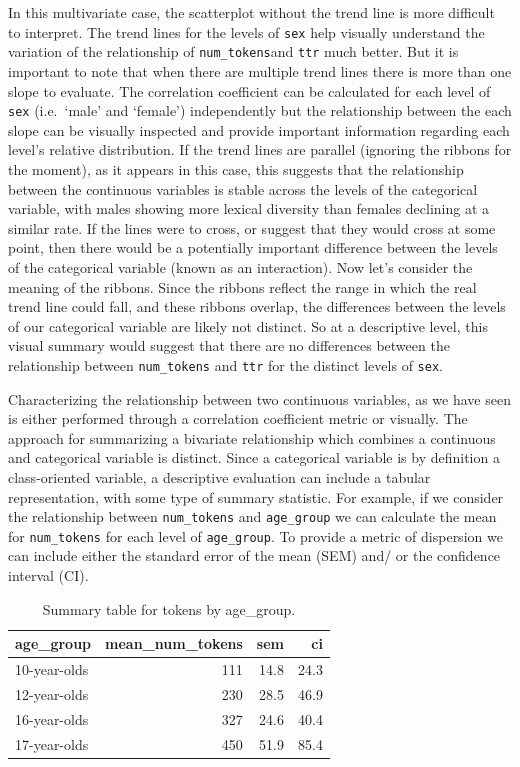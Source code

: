 \documentclass[
  letterpaper,
]{scrbook}
\begin{document}
In this multivariate case, the scatterplot without the trend line is
more difficult to interpret. The trend lines for the levels of
\texttt{sex} help visually understand the variation of the relationship
of \texttt{num\_tokens}and \texttt{ttr} much better. But it is important
to note that when there are multiple trend lines there is more than one
slope to evaluate. The correlation coefficient can be calculated for
each level of \texttt{sex} (i.e.~`male' and `female') independently but
the relationship between the each slope can be visually inspected and
provide important information regarding each level's relative
distribution. If the trend lines are parallel (ignoring the ribbons for
the moment), as it appears in this case, this suggests that the
relationship between the continuous variables is stable across the
levels of the categorical variable, with males showing more lexical
diversity than females declining at a similar rate. If the lines were to
cross, or suggest that they would cross at some point, then there would
be a potentially important difference between the levels of the
categorical variable (known as an interaction). Now let's consider the
meaning of the ribbons. Since the ribbons reflect the range in which the
real trend line could fall, and these ribbons overlap, the differences
between the levels of our categorical variable are likely not distinct.
So at a descriptive level, this visual summary would suggest that there
are no differences between the relationship between \texttt{num\_tokens}
and \texttt{ttr} for the distinct levels of \texttt{sex}.

Characterizing the relationship between two continuous variables, as we
have seen is either performed through a correlation coefficient metric
or visually. The approach for summarizing a bivariate relationship which
combines a continuous and categorical variable is distinct. Since a
categorical variable is by definition a class-oriented variable, a
descriptive evaluation can include a tabular representation, with some
type of summary statistic. For example, if we consider the relationship
between \texttt{num\_tokens} and \texttt{age\_group} we can calculate
the mean for \texttt{num\_tokens} for each level of \texttt{age\_group}.
To provide a metric of dispersion we can include either the standard
error of the mean (SEM) and/ or the confidence interval (CI).

\hypertarget{tbl-summarize-bivariate-cont-cat-belc}{}
\begin{table}
\caption{\label{tbl-summarize-bivariate-cont-cat-belc}Summary table for tokens by age\_group. }\tabularnewline

\centering
\begin{tabular}{lrrr}
\toprule
age\_group & mean\_num\_tokens & sem & ci\\
\midrule
10-year-olds & 111 & 14.8 & 24.3\\
12-year-olds & 230 & 28.5 & 46.9\\
16-year-olds & 327 & 24.6 & 40.4\\
17-year-olds & 450 & 51.9 & 85.4\\
\bottomrule
\end{tabular}
\end{table}
\end{document}
